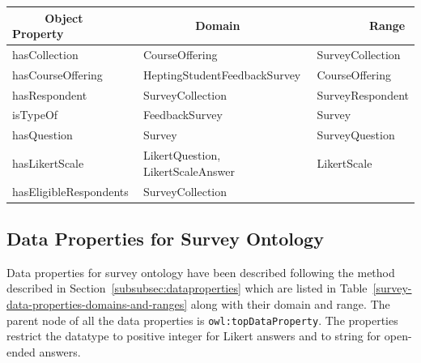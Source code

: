 \begin{doublespace}
\begin{table}[h!]
    \begin{tabular}{|l|l|l|} 
    \hline \ \ \ \ \ Object Property & \ \ \ \ \ \ \ \ Domain & \ \ \ \ \ \ \ \ Range\\ \hline
     hasCollection & CourseOffering & SurveyCollection\\ \hline
     hasCourseOffering & HeptingStudentFeedbackSurvey & CourseOffering\\ \hline
     hasRespondent & SurveyCollection & SurveyRespondent\\ \hline
     isTypeOf & FeedbackSurvey & Survey\\ \hline
     hasQuestion & Survey & SurveyQuestion\\ \hline
     hasLikertScale & LikertQuestion, LikertScaleAnswer & LikertScale\\ \hline
     hasEligibleRespondents & SurveyCollection & \\ \hline
    \end{tabular}
    
\end{table}

\subsection{Data Properties for Survey Ontology}
\label{subsec:surveydataproperties}

Data properties for survey ontology have been described following the method described in 
Section~\ref{subsubsec:dataproperties} 
which are listed in 
Table~\ref{survey-data-properties-domains-and-ranges} 
along with their domain and range. 
The parent node of all the data properties is {\tt owl:topDataProperty}.
The properties restrict the datatype to positive integer for Likert answers 
and to string for open-ended answers.

\begin{table}[h!]
    \centering
    
    \caption{Data Properties and Their Domain and Range}
    \label{survey-data-properties-domains-and-ranges}
    

\end{table}
\end{doublespace}
